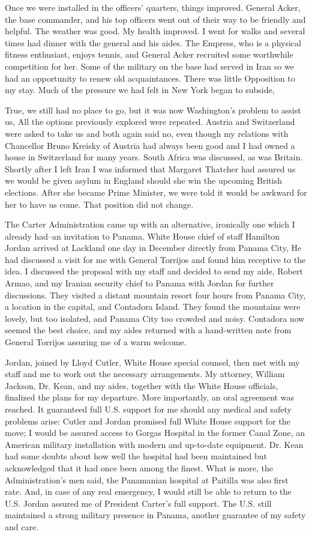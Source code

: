 Once we were installed in the officers’ quarters, things improved. General Acker, the base commander, and his top officers went out of their way to be friendly and helpful. The weather was good. My health improved. I went for walks and several times had dinner with the general and his aides. The Empress, who is a physical fitness enthusiast, enjoys tennis, and General Acker recruited some worthwhile competition for her. Some of the military on the base had served in Iran so we had an opportunity to renew old acquaintances. There was little Opposition to my stay. Much of the pressure we had felt in New York began to subside, 

True, we still had no place to go, but it was now Washington's problem to assist us, All the options previously explored were repeated. Austria and Switzerland were asked to take us and both again said no, even though my relations with Chancellor Bruno Kreisky of Austria had always been good and I had owned a house in Switzerland for many years. South Africa was discussed, as was Britain. Shortly after I left Iran I was informed that Margaret Thatcher had assured us we would be given asylum in England should she win the upcoming British elections. After she became Prime Minister, we were told it would be awkward for her to have us come. That position did not change. 

The Carter Administration came up with an alternative, ironically one which I already had--an invitation to Panama. White House chief of staff Hamilton Jordan arrived at Lackland one day in December directly from Panama City, He had discussed a visit for me with General Torrijos and found him receptive to the idea. I discussed the proposal with my staff and decided to send my aide, Robert Armao, and my Iranian security chief to Panama with Jordan for further discussions. They visited a distant mountain resort four hours from Panama City, a location in the capital, and Contadora Island. They found the mountains were lovely, but too isolated, and Panama City too crowded and noisy. Contadora now seemed the best choice, and my aides returned with a hand-written note from General Torrijos assuring me of a warm welcome. 

Jordan, joined by Lloyd Cutler, White House special counsel, then met with my staff and me to work out the necessary arrangements. My attorney, William Jackson, Dr. Kean, and my aides, together with the White House officials, finalized the plans for my departure. More importantly, an oral agreement was reached. It guaranteed full U.S. support for me should any medical and safety problems arise: Cutler and Jordan promised full White House support for the move; I would be assured access to Gorgas Hospital in the former Canal Zone, an American military installation with modern and up-to-date equipment. Dr. Kean had some doubts about how well the hospital had been maintained but acknowledged that it had once been among the finest. What is more, the Administration's men said, the Panamanian hospital at Paitilla was also first rate. And, in case of any real emergency, I would still be able to return to the U.S. Jordan assured me of President Carter's full support. The U.S. still maintained a strong military presence in Panama, another guarantee of my safety and care. 

